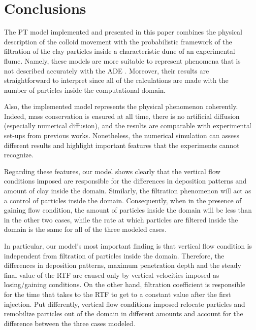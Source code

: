 \documentclass[draft,linenumbers]{agujournal2018}
\begin{document}
\section{Conclusions} \label{Conclusions}

The PT model implemented and presented in this paper combines the physical description of the colloid movement with the probabilistic framework of the filtration of the clay particles inside a characteristic dune of an experimental flume. Namely, these models are more suitable to represent phenomena that is not described accurately with the ADE \citep{Noetinger2016}. Moreover, their results are straightforward to interpret since all of the calculations are made with the number of particles inside the computational domain. 

Also, the implemented model represents the physical phenomenon coherently. Indeed, mass conservation is ensured at all time, there is no artificial diffusion (especially numerical diffusion), and the results are comparable with experimental set-ups from previous works. Nonetheless, the numerical simulation can assess different results and highlight important features that the experiments cannot recognize. 

Regarding these features, our model shows clearly that the vertical flow conditions imposed are responsible for the differences in deposition patterns and amount of clay inside the domain. Similarly, the filtration phenomenon will act as a control of particles inside the domain. Consequently, when in the presence of gaining flow condition, the amount of particles inside the domain will be less than in the other two cases, while the rate at which particles are filtered inside the domain is the same for all of the three modeled cases.

In particular, our model's most important finding is that vertical flow condition is independent from filtration of particles inside the domain. Therefore, the differences in deposition patterns, maximum penetration depth and the steady final value of the RTF are caused only by vertical velocities imposed as losing/gaining conditions. On the other hand, filtration coefficient is responsible for the time that takes to the RTF to get to a constant value after the first injection. Put differently, vertical flow conditions imposed relocate particles and remobilize particles out of the domain in different amounts and account for the difference between the three cases modeled.
\end{document}
